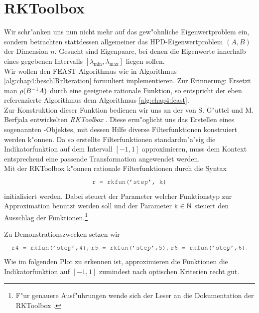 \section{RKToolbox}

Wir schr"anken uns nun nicht mehr auf das gew"ohnliche Eigenwertproblem ein, sondern betrachten stattdessen allgemeiner das HPD-Eigenwertproblem $(A,B)$ der Dimension $n$. Gesucht sind Eigenpaare, bei denen die Eigenwerte innerhalb eines gegebenen Intervalls $[\lambda_{\min}, \lambda_{\max}]$ liegen sollen.\\

Wir wollen den FEAST-Algorithmus wie in Algorithmus \ref{alg:chap4:beschlRrIteration} formuliert implementieren. Zur Erinnerung: Ersetzt man $\rho(B^{-1}A)$ durch eine geeignete rationale Funktion, so entspricht der eben referenzierte Algorithmus dem Algorithmus \ref{alg:chap4:feast}.\\

Zur Konstruktion dieser Funktion bedienen wir uns an der von S. G"uttel und M. Berfjala entwickelten \emph{RKToolbox} \cite{rkt}. Diese erm"oglicht uns das Erstellen eines sogenannten -Objektes, mit dessen Hilfe diverse Filterfunktionen konstruiert werden k"onnen. Da so erstellte Filterfunktionen standardm"a"sig die Indikatorfunktion auf dem Intervall $[-1,1]$ approximieren, muss dem Kontext entsprechend eine passende Transformation angewendet werden.\\

Mit der RKToolbox k"onnen rationale Filterfunktionen  durch die Syntax
\[
\mcode{r = rkfun('step', k)}
\]
initialisiert werden. Dabei steuert der Parameter  welcher Funktionstyp zur Approximation benutzt werden soll und der Parameter $\mcode{k} \in \N$ steuert den Ausschlag der Funktionen.\footnote{F"ur genauere Ausf"uhrungen wende sich der Leser an die Dokumentation der RKToolbox \cite{rkt}.}

\newpage

Zu Demonstrationszwecken setzen wir
\[
\mcode{r4 = rkfun('step',4)}\text{,  }\mcode{r5 = rkfun('step',5)}\text{,  }
\mcode{r6 = rkfun('step',6)}.
\]
Wie im folgenden Plot zu erkennen ist, approximieren die Funktionen die Indikatorfunktion auf $[-1,1]$ zumindest nach optischen Kriterien recht gut.

